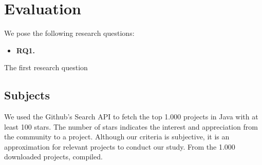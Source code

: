 \section{Evaluation}

We pose the following research questions:

\newcommand{\RQONE}{\textbf{RQ1.}}
\newcommand{\rqOne}{\RQONE{}~}

\begin{itemize}
    \item \rqOne
\end{itemize}

The first research question 

\subsection{Subjects}
\label{sec:subjects}

We used the Github's Search API to fetch the top 1.000 projects in
Java with at least 100 stars. The number of stars indicates the
interest and appreciation from the community to a project.
 Although our
criteria is subjective, it is an approximation for relevant projects
to conduct our study. From the 1.000 downloaded projects, 
compiled.  



